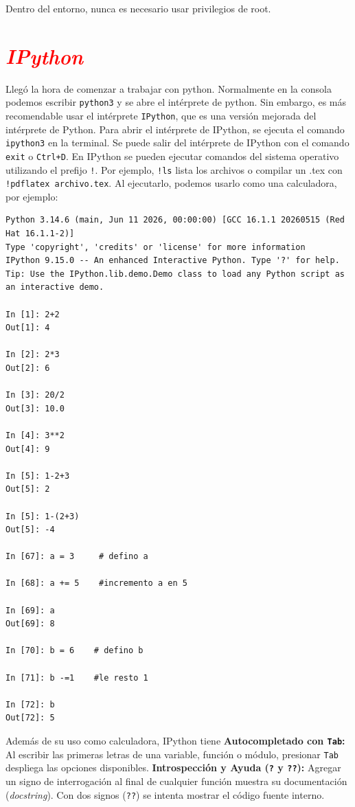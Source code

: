 \documentclass[12pt]{article}
\begin{document}
\begin{cajaflex}
    Dentro del entorno, nunca es necesario usar privilegios de root.
\end{cajaflex}


	\section*{\textcolor{red}{\textit{IPython}}}

   	Llegó la hora de comenzar a trabajar con python. Normalmente en la consola podemos escribir
	\lstinline|python3| y se abre el intérprete de python. Sin embargo, es más recomendable usar
	el intérprete \lstinline|IPython|, que es una versión mejorada del intérprete de Python.
	Para abrir el intérprete de IPython, se ejecuta el comando \lstinline|ipython3| en la terminal. 
	Se puede salir del intérprete de IPython con el comando \lstinline|exit| o \lstinline|Ctrl+D|. 
	En IPython se pueden ejecutar comandos del sistema operativo 
	utilizando el prefijo \lstinline|!|. Por ejemplo, \lstinline|!ls| lista los archivos o 
	compilar un .tex con \lstinline|!pdflatex archivo.tex|. Al ejecutarlo, podemos usarlo como 
	una calculadora, por ejemplo: 
\begin{lstlisting}
Python 3.14.6 (main, Jun 11 2026, 00:00:00) [GCC 16.1.1 20260515 (Red Hat 16.1.1-2)]
Type 'copyright', 'credits' or 'license' for more information
IPython 9.15.0 -- An enhanced Interactive Python. Type '?' for help.
Tip: Use the IPython.lib.demo.Demo class to load any Python script as an interactive demo.

In [1]: 2+2
Out[1]: 4

In [2]: 2*3
Out[2]: 6

In [3]: 20/2
Out[3]: 10.0

In [4]: 3**2
Out[4]: 9

In [5]: 1-2+3
Out[5]: 2

In [5]: 1-(2+3)
Out[5]: -4

In [67]: a = 3     # defino a

In [68]: a += 5    #incremento a en 5

In [69]: a
Out[69]: 8

In [70]: b = 6    # defino b

In [71]: b -=1    #le resto 1

In [72]: b
Out[72]: 5
\end{lstlisting}
%
Además de su uso como calculadora, IPython tiene \textbf{Autocompletado con \texttt{Tab}:} 
Al escribir las primeras letras de una variable, función o módulo, presionar \texttt{Tab} 
despliega las opciones disponibles.
\textbf{Introspección y Ayuda (\texttt{?} y \texttt{??}):} Agregar un signo de interrogación al 
final de cualquier función muestra su documentación (\textit{docstring}). 
Con dos signos (\texttt{??}) se intenta mostrar el código fuente interno.
\end{document}
